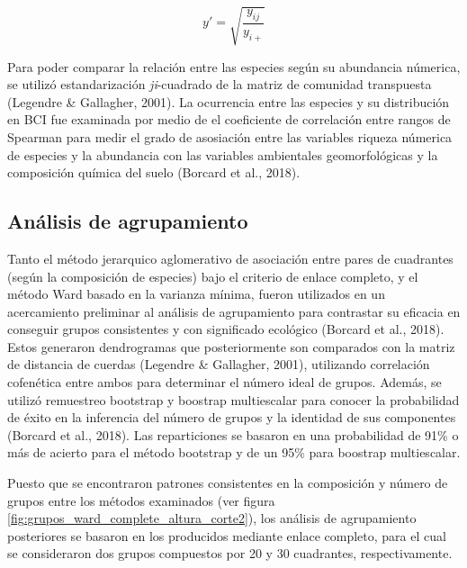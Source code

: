 \documentclass[11pt,]{article}
\begin{document}
\begin{equation} \label{eq:hell_transf}
y' = \sqrt{\frac{y_{ij}}{y_{i+}}}
\end{equation}

Para poder comparar la relación entre las especies según su abundancia
númerica, se utilizó estandarización \emph{ji}-cuadrado de la matriz de
comunidad transpuesta (Legendre \& Gallagher, 2001). La ocurrencia entre
las especies y su distribución en BCI fue examinada por medio de el
coeficiente de correlación entre rangos de Spearman para medir el grado
de asosiación entre las variables riqueza númerica de especies y la
abundancia con las variables ambientales geomorfológicas y la
composición química del suelo (Borcard et al., 2018).

\subsection{Análisis de agrupamiento}\label{anuxe1lisis-de-agrupamiento}

Tanto el método jerarquico aglomerativo de asociación entre pares de
cuadrantes (según la composición de especies) bajo el criterio de enlace
completo, y el método Ward basado en la varianza mínima, fueron
utilizados en un acercamiento preliminar al análisis de agrupamiento
para contrastar su eficacia en conseguir grupos consistentes y con
significado ecológico (Borcard et al., 2018). Estos generaron
dendrogramas que posteriormente son comparados con la matriz de
distancia de cuerdas (Legendre \& Gallagher, 2001), utilizando
correlación cofenética entre ambos para determinar el número ideal de
grupos. Además, se utilizó remuestreo bootstrap y boostrap multiescalar
para conocer la probabilidad de éxito en la inferencia del número de
grupos y la identidad de sus componentes (Borcard et al., 2018). Las
reparticiones se basaron en una probabilidad de 91\% o más de acierto
para el método bootstrap y de un 95\% para boostrap multiescalar.

Puesto que se encontraron patrones consistentes en la composición y
número de grupos entre los métodos examinados (ver figura
\ref{fig:grupos_ward_complete_altura_corte2}), los análisis de
agrupamiento posteriores se basaron en los producidos mediante enlace
completo, para el cual se consideraron dos grupos compuestos por 20 y 30
cuadrantes, respectivamente.
\end{document}
